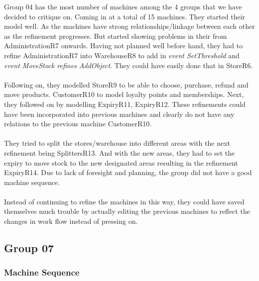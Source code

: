 Group 04 has the most number of machines among the 4 groups that we have decided to critique on. Coming in at a total of 15 machines. They started their model well. As the machines have strong relationships\slash linkage between each other as the refinement progresses. But started showing problems in their from AdministrationR7 onwards. Having not planned well before hand, they had to refine AdministrationR7 into WarehouseR8 to add in \emph{event SetThreshold} and \emph{event MoveStock refines AddObject}. They could have easily done that in StoreR6.  \\ \\  Following on, they modelled StoreR9 to be able to choose, purchase, refund and move products. CustomerR10 to model loyalty points and memberships. Next, they followed on by modelling ExpiryR11, ExpiryR12. These refinements could have been incorporated into previous machines and clearly do not have any relations to the previous machine CustomerR10.  \\ \\  They tried to split the stores\slash warehouse into different areas with the next refinement being SplittersR13. And with the new areas, they had to set the expiry to move stock to the new designated areas resulting in the refinement ExpiryR14. Due to lack of foresight and planning, the group did not have a good machine sequence.  \\ \\  Instead of continuing to refine the machines in this way, they could have saved themselves much trouble by actually editing the previous machines to reflect the changes in work flow instead of pressing on.

\subsection{Group 07}
\label{group07}

\subsubsection{Machine Sequence}
\label{machinesequence}

